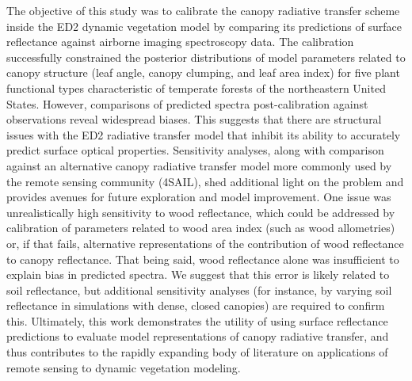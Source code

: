 \conclusions  %

The objective of this study was to calibrate the canopy radiative transfer scheme inside the ED2 dynamic vegetation model by comparing its predictions of surface reflectance against airborne imaging spectroscopy data.
The calibration successfully constrained the posterior distributions of model parameters related to canopy structure (leaf angle, canopy clumping, and leaf area index) for five plant functional types characteristic of temperate forests of the northeastern United States.  
However, comparisons of predicted spectra post-calibration against observations reveal widespread biases.
This suggests that there are structural issues with the ED2 radiative transfer model that inhibit its ability to accurately predict surface optical properties.
Sensitivity analyses, along with comparison against an alternative canopy radiative transfer model more commonly used by the remote sensing community (4SAIL), shed additional light on the problem and provides avenues for future exploration and model improvement.
One issue was unrealistically high sensitivity to wood reflectance, which could be addressed by calibration of parameters related to wood area index (such as wood allometries) or, if that fails, alternative representations of the contribution of wood reflectance to canopy reflectance.
That being said, wood reflectance alone was insufficient to explain bias in predicted spectra.\@
We suggest that this error is likely related to soil reflectance, but additional sensitivity analyses (for instance, by varying soil reflectance in simulations with dense, closed canopies) are required to confirm this.
Ultimately, this work demonstrates the utility of using surface reflectance predictions to evaluate model representations of canopy radiative transfer, and thus contributes to the rapidly expanding body of literature on applications of remote sensing to dynamic vegetation modeling.
